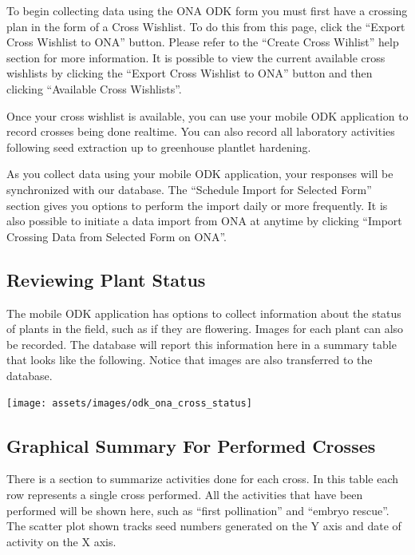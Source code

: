 \documentclass[
  12pt,
]{book}
\begin{document}
To begin collecting data using the ONA ODK form you must first have a crossing plan in the form of a Cross Wishlist. To do this from this page, click the ``Export Cross Wishlist to ONA'' button. Please refer to the ``Create Cross Wihlist'' help section for more information. It is possible to view the current available cross wishlists by clicking the ``Export Cross Wishlist to ONA'' button and then clicking ``Available Cross Wishlists''.

Once your cross wishlist is available, you can use your mobile ODK application to record crosses being done realtime. You can also record all laboratory activities following seed extraction up to greenhouse plantlet hardening.

As you collect data using your mobile ODK application, your responses will be synchronized with our database. The ``Schedule Import for Selected Form'' section gives you options to perform the import daily or more frequently. It is also possible to initiate a data import from ONA at anytime by clicking ``Import Crossing Data from Selected Form on ONA''.

\hypertarget{reviewing-plant-status}{%
\subsection{Reviewing Plant Status}\label{reviewing-plant-status}}

The mobile ODK application has options to collect information about the status of plants in the field, such as if they are flowering. Images for each plant can also be recorded. The database will report this information here in a summary table that looks like the following. Notice that images are also transferred to the database.

\begin{center}\texttt{[image: assets/images/odk\_ona\_cross\_status]} \end{center}

\hypertarget{graphical-summary-for-performed-crosses}{%
\subsection{Graphical Summary For Performed Crosses}\label{graphical-summary-for-performed-crosses}}

There is a section to summarize activities done for each cross. In this table each row represents a single cross performed. All the activities that have been performed will be shown here, such as ``first pollination'' and ``embryo rescue''. The scatter plot shown tracks seed numbers generated on the Y axis and date of activity on the X axis.
\end{document}
